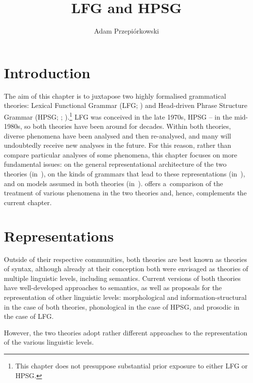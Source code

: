 \documentclass[output=paper,hidelinks]{langscibook}
\author{Adam Przepiórkowski\affiliation{University of Warsaw, Polish Academy of Sciences \& University of Oxford}}
\title{LFG and HPSG}
\begin{document}
\maketitle
\label{chap:HPSG}

\section{Introduction}

The aim of this chapter is to juxtapose two highly formalised grammatical theories: Lexical Functional Grammar (LFG; \citealt{kaplanbresnan82,BresnanEtAl2016,DLM:LFG}) and Head\hyp{}driven Phrase Structure Grammar (HPSG; \citealt{pollardsag87,pollard1994head-driven}; \citealt{mue:etal:21:ed}).\footnote{This chapter does not presuppose substantial prior exposure to either LFG or HPSG\@.}  LFG was conceived in the late 1970s, HPSG -- in the mid-1980s, so both theories have been around for decades.  Within both theories, diverse phenomena have been analysed and then re-analysed, and many will undoubtedly receive new analyses in the future.  For this reason, rather than compare particular analyses of some phenomena, this chapter focuses on more fundamental issues: on the general representational architecture of the two theories (in~), on the kinds of grammars that lead to these representations (in~), and on models assumed in both theories (in~).  \citet{wec:asu:20} offers a~comparison of the treatment of various phenomena in the two theories and, hence, complements the current chapter.

\section{Representations}
\label{sec:arch}

Outside of their respective communities, both theories are best known as theories of syntax, although already at their conception both were envisaged as theories of multiple linguistic levels, including semantics. Current versions of both theories have well\hyp{}developed approaches to semantics, as well as proposals for the representation of other linguistic levels: morphological and information\hyp{}structural in the case of both theories, phonological in the case of HPSG, and prosodic in the case of LFG.

However, the two theories adopt rather different approaches to the representation of the various linguistic levels.  
\end{document}
